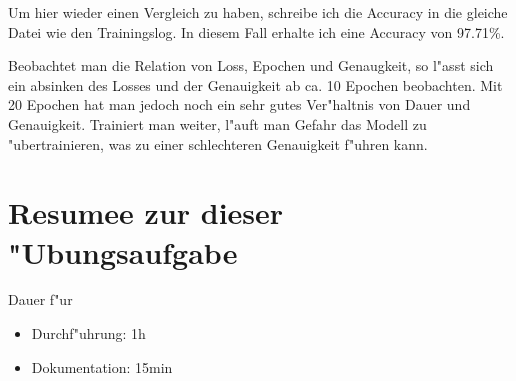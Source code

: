 \documentclass[a4paper,11pt,titlepage]{article}
\begin{document}
    Um hier wieder einen Vergleich zu haben, schreibe ich die Accuracy in die gleiche Datei wie den Trainingslog.
    In diesem Fall erhalte ich eine Accuracy von 97.71\%.

    Beobachtet man die Relation von Loss, Epochen und Genaugkeit, so l"asst sich ein absinken des Losses und der Genauigkeit ab ca. 10 Epochen beobachten.
    Mit 20 Epochen hat man jedoch noch ein sehr gutes Ver"haltnis von Dauer und Genauigkeit.
    Trainiert man weiter, l"auft man Gefahr das Modell zu "ubertrainieren, was zu einer schlechteren Genauigkeit f"uhren kann.

    \section{Resumee zur dieser "Ubungsaufgabe}
    Dauer f"ur
    \begin{itemize}
        \item Durchf"uhrung: 1h
        \item Dokumentation: 15min
    \end{itemize}

    \begin{thebibliography}{99}
    \end{thebibliography}
\end{document}
